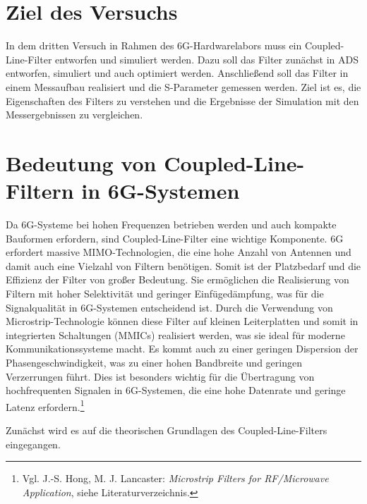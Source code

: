 \section{Ziel des Versuchs}
    In dem dritten Versuch in Rahmen des 6G-Hardwarelabors muss ein Coupled-Line-Filter entworfen und simuliert werden. Dazu soll das Filter zunächst in ADS entworfen, simuliert und auch optimiert werden. 
    Anschließend soll das Filter in einem Messaufbau realisiert und die S-Parameter gemessen werden. Ziel ist es, die Eigenschaften des Filters zu verstehen und die Ergebnisse der Simulation mit den Messergebnissen zu vergleichen.
\section{Bedeutung von Coupled-Line-Filtern in 6G-Systemen}
    Da 6G-Systeme bei hohen Frequenzen betrieben werden und auch kompakte Bauformen erfordern, sind Coupled-Line-Filter eine wichtige Komponente. 6G erfordert massive MIMO-Technologien, die eine hohe Anzahl von Antennen und damit auch eine Vielzahl von Filtern benötigen.
    Somit ist der Platzbedarf und die Effizienz der Filter von großer Bedeutung.
    Sie ermöglichen die Realisierung von Filtern mit hoher Selektivität und geringer Einfügedämpfung, was für die Signalqualität in 6G-Systemen entscheidend ist.
    Durch die Verwendung von Microstrip-Technologie können diese Filter auf kleinen Leiterplatten und somit in integrierten Schaltungen (MMICs) realisiert werden, was sie ideal für moderne Kommunikationssysteme macht. Es kommt auch zu einer geringen Dispersion der Phasengeschwindigkeit, was zu einer hohen Bandbreite und geringen Verzerrungen führt. Dies ist besonders wichtig für die Übertragung von hochfrequenten Signalen in 6G-Systemen, die eine hohe Datenrate und geringe Latenz erfordern.\footnote{Vgl. J.-S. Hong, M. J. Lancaster: \textit{Microstrip Filters for RF/Microwave Application}, siehe Literaturverzeichnis.}
    
    Zunächst wird es auf die theorischen Grundlagen des Coupled-Line-Filters eingegangen.


\clearpage